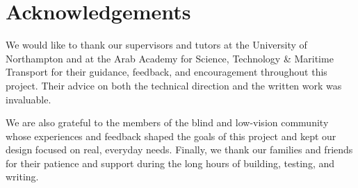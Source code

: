 \chapter*{Acknowledgements}

We would like to thank our supervisors and tutors at the University of Northampton and at the Arab Academy for Science, Technology \& Maritime Transport for their guidance, feedback, and encouragement throughout this project. Their advice on both the technical direction and the written work was invaluable.

We are also grateful to the members of the blind and low-vision community whose experiences and feedback shaped the goals of this project and kept our design focused on real, everyday needs. Finally, we thank our families and friends for their patience and support during the long hours of building, testing, and writing.

\clearpage
